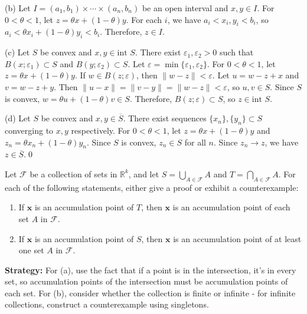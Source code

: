 (b) Let $I = (a_1,b_1) \times \cdots \times (a_n,b_n)$ be an open interval and $x, y \in I$. For $0 < \theta < 1$, let $z = \theta x + (1-\theta)y$. For each $i$, we have $a_i < x_i, y_i < b_i$, so $a_i < \theta x_i + (1-\theta)y_i < b_i$. Therefore, $z \in I$.

(c) Let $S$ be convex and $x, y \in \text{int } S$. There exist $\varepsilon_1, \varepsilon_2 > 0$ such that $B(x;\varepsilon_1) \subset S$ and $B(y;\varepsilon_2) \subset S$. Let $\varepsilon = \min\{\varepsilon_1, \varepsilon_2\}$. For $0 < \theta < 1$, let $z = \theta x + (1-\theta)y$. If $w \in B(z;\varepsilon)$, then $\|w-z\| < \varepsilon$. Let $u = w - z + x$ and $v = w - z + y$. Then $\|u-x\| = \|v-y\| = \|w-z\| < \varepsilon$, so $u, v \in S$. Since $S$ is convex, $w = \theta u + (1-\theta)v \in S$. Therefore, $B(z;\varepsilon) \subset S$, so $z \in \text{int } S$.

(d) Let $S$ be convex and $x, y \in \overline{S}$. There exist sequences $\{x_n\}, \{y_n\} \subset S$ converging to $x, y$ respectively. For $0 < \theta < 1$, let $z = \theta x + (1-\theta)y$ and $z_n = \theta x_n + (1-\theta)y_n$. Since $S$ is convex, $z_n \in S$ for all $n$. Since $z_n \to z$, we have $z \in \overline{S}$.\qed


\begin{problembox}
\begin{problemstatement}
Let $\mathcal{F}$ be a collection of sets in $\mathbb{R}^k$, and let $S = \bigcup_{A \in \mathcal{F}} A$ and $T = \bigcap_{A \in \mathcal{F}} A$. For each of the following statements, either give a proof or exhibit a counterexample:
\begin{enumerate}[label=\alph*)]
\item If $\mathbf{x}$ is an accumulation point of $T$, then $\mathbf{x}$ is an accumulation point of each set $A$ in $\mathcal{F}$.
\item If $\mathbf{x}$ is an accumulation point of $S$, then $\mathbf{x}$ is an accumulation point of at least one set $A$ in $\mathcal{F}$.
\end{enumerate}
\end{problemstatement}
\end{problembox}

\noindent\textbf{Strategy:} For (a), use the fact that if a point is in the intersection, it's in every set, so accumulation points of the intersection must be accumulation points of each set. For (b), consider whether the collection is finite or infinite - for infinite collections, construct a counterexample using singletons.

